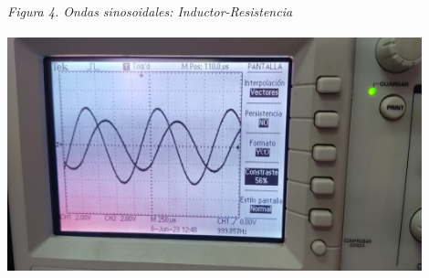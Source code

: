 \documentclass[12pt]{article}
\begin{document}
	\vspace{2cm}
	
	\textit{Figura 4. Ondas sinosoidales: Inductor-Resistencia}
	\begin{center}
		\includegraphics[width=12cm,height=7cm]{Img/lab_5_img_17}
	\end{center}
	
\end{document}
